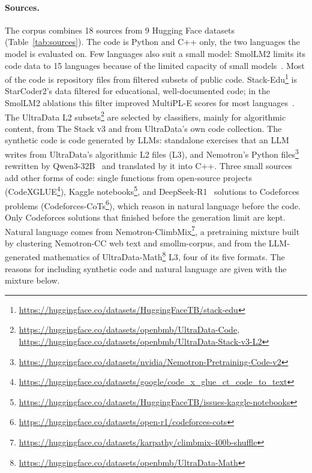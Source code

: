 \documentclass[sigconf,nonacm,balance=false]{acmart}
\begin{document}
\paragraph{Sources.} The corpus combines 18 sources from 9 Hugging Face datasets (Table~\ref{tab:sources}). The code
is Python and C++ only, the two languages the model is evaluated on. Few languages also suit a small model: SmolLM2
limits its code data to 15 languages because of the limited capacity of small models~\cite{benallal2025smollm2}. Most
of the code is repository files from filtered subsets of public code. Stack-Edu\footnote{\url{https://huggingface.co/datasets/HuggingFaceTB/stack-edu}}
is StarCoder2's data filtered for educational, well-documented code; in the SmolLM2 ablations this filter improved
MultiPL-E scores for most languages~\cite{benallal2025smollm2}. The UltraData L2
subsets\footnote{\url{https://huggingface.co/datasets/openbmb/UltraData-Code},
\url{https://huggingface.co/datasets/openbmb/UltraData-Stack-v3-L2}} are selected by classifiers, mainly for
algorithmic content, from The Stack v3 and from UltraData's own code collection. The synthetic code is code generated
by LLMs: standalone exercises that an LLM writes from UltraData's algorithmic L2 files (L3), and Nemotron's Python
files\footnote{\url{https://huggingface.co/datasets/nvidia/Nemotron-Pretraining-Code-v2}} rewritten by
Qwen3-32B~\cite{yang2025qwen3} and translated by it into C++. Three small sources add other forms of code: single
functions from open-source projects
(CodeXGLUE\footnote{\url{https://huggingface.co/datasets/google/code_x_glue_ct_code_to_text}}), Kaggle
notebooks\footnote{\url{https://huggingface.co/datasets/HuggingFaceTB/issues-kaggle-notebooks}}, and
DeepSeek-R1~\cite{deepseek2025r1} solutions to Codeforces problems
(Codeforces-CoTs\footnote{\url{https://huggingface.co/datasets/open-r1/codeforces-cots}}), which reason in natural
language before the code. Only Codeforces solutions that finished before the generation limit are kept. Natural
language comes from Nemotron-ClimbMix\footnote{\url{https://huggingface.co/datasets/karpathy/climbmix-400b-shuffle}},
a pretraining mixture built by clustering Nemotron-CC web text and smollm-corpus, and from the LLM-generated
mathematics of UltraData-Math\footnote{\url{https://huggingface.co/datasets/openbmb/UltraData-Math}} L3, four of its
five formats. The reasons for including synthetic code and natural language are given with the
mixture below.
\end{document}
